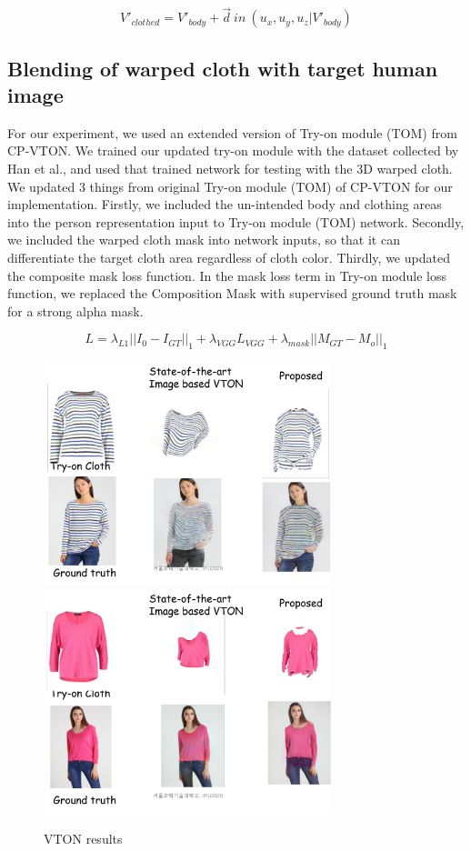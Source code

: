 \begin{equation}
 V'_{clothed} = V'_{body} + \overrightarrow{d} \: in \: (u_x, u_y, u_z | V'_{body})
\end{equation}



\subsection{Blending of warped cloth with target human image}

For our experiment, we used an extended version of Try-on module (TOM) from CP-VTON\cite{Wang2018TowardCI}. We trained  our updated try-on module with the dataset collected by Han et al.\cite{Han2017VITONAI}, and used that trained network for testing with the 3D warped cloth. We updated 3 things from original Try-on module (TOM) of CP-VTON\cite{Wang2018TowardCI} for our implementation. Firstly, we included the un-intended body and clothing areas into the person representation input to Try-on module (TOM) network\cite{Wang2018TowardCI}. Secondly, we included the warped cloth mask into network inputs, so that it can differentiate the target cloth area regardless of cloth color. Thirdly, we updated the composite mask loss function\cite{Wang2018TowardCI}. In the mask loss term in Try-on module loss function\cite{Wang2018TowardCI}, we replaced the Composition Mask with supervised ground truth mask for a strong alpha mask.


\begin{equation}
L = \lambda_{L1} || I_0-I_{GT}||_1+  \lambda_{VGG} L_{VGG} + \lambda_{mask} ||M_{GT}-M_o||_1       
\end{equation}


\begin{figure}[t]
\centering
\includegraphics[height=6.5cm, scale=1]{figures/vton_result1.png} 
\includegraphics[height=6.5cm, scale=1]{figures/vton_result2.png} 
\caption{VTON results}
\label{fig:vtonresults}
\end{figure}


